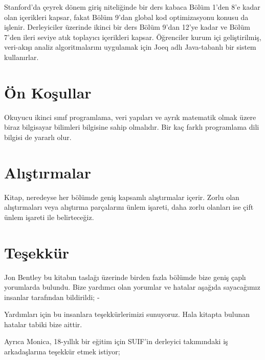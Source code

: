 Stanford'da çeyrek dönem giriş niteliğinde bir ders kabaca Bölüm 1'den 8'e kadar olan içerikleri kapsar, fakat Bölüm 9'dan global kod optimizasyonu konusu da işlenir. Derleyiciler üzerinde ikinci bir ders Bölüm 9'dan 12'ye kadar ve Bölüm 7'den ileri seviye atık toplayıcı içerikleri kapsar. Öğrenciler kurum içi geliştirilmiş, veri-akışı analiz algoritmalarını uygulamak için {\selectfont 
Joeq
}adlı Java-tabanlı bir sistem kullanırlar.

\section*{Ön Koşullar}
Okuyucu ikinci sınıf programlama, veri yapıları ve ayrık matematik olmak üzere biraz bilgisayar bilimleri bilgisine sahip olmalıdır. Bir kaç farklı programlama dili bilgisi de yararlı olur.

\section*{Alıştırmalar}
Kitap, neredeyse her bölümde geniş kapsamlı alıştırmalar içerir. Zorlu olan alıştırmaları veya alıştırma parçalarını ünlem işareti, daha zorlu olanları ise çift ünlem işareti ile belirteceğiz.

\section*{Teşekkür}
Jon Bentley bu kitabın taslağı üzerinde birden fazla bölümde bize geniş çaplı yorumlarda bulundu. Bize yardımcı olan yorumlar ve hatalar aşağıda sayacağımız insanlar tarafından bildirildi;
-

Yardımları için bu insanlara teşekkürlerimizi sunuyoruz. Hala kitapta bulunan hatalar tabiki bize aittir.

Ayrıca Monica, 18-yıllık bir eğitim için SUIF'in derleyici takımındaki iş arkadaşlarına teşekkür etmek istiyor;